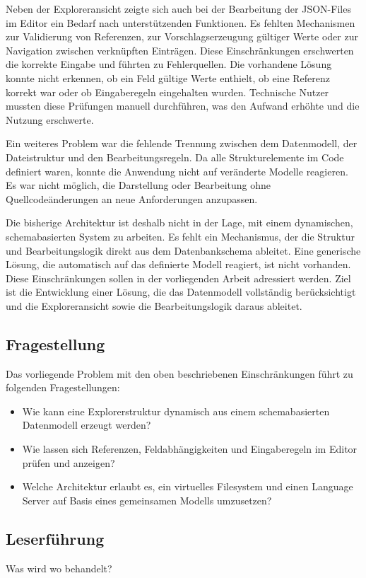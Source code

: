 Neben der Exploreransicht zeigte sich auch bei der Bearbeitung der JSON-Files im Editor ein Bedarf nach unterstützenden Funktionen. Es fehlten Mechanismen zur Validierung von Referenzen, zur Vorschlagserzeugung gültiger Werte oder zur Navigation zwischen verknüpften Einträgen. Diese Einschränkungen erschwerten die korrekte Eingabe und führten zu Fehlerquellen. Die vorhandene Lösung konnte nicht erkennen, ob ein Feld gültige Werte enthielt, ob eine Referenz korrekt war oder ob Eingaberegeln eingehalten wurden. Technische Nutzer mussten diese Prüfungen manuell durchführen, was den Aufwand erhöhte und die Nutzung erschwerte.

Ein weiteres Problem war die fehlende Trennung zwischen dem Datenmodell, der Dateistruktur und den Bearbeitungsregeln. Da alle Strukturelemente im Code definiert waren, konnte die Anwendung nicht auf veränderte Modelle reagieren. Es war nicht möglich, die Darstellung oder Bearbeitung ohne Quellcodeänderungen an neue Anforderungen anzupassen.

Die bisherige Architektur ist deshalb nicht in der Lage, mit einem dynamischen, schemabasierten System zu arbeiten. Es fehlt ein Mechanismus, der die Struktur und Bearbeitungslogik direkt aus dem Datenbankschema ableitet. Eine generische Lösung, die automatisch auf das definierte Modell reagiert, ist nicht vorhanden. Diese Einschränkungen sollen in der vorliegenden Arbeit adressiert werden. Ziel ist die Entwicklung einer Lösung, die das Datenmodell vollständig berücksichtigt und die Exploreransicht sowie die Bearbeitungslogik daraus ableitet.

\subsection{Fragestellung}
Das vorliegende Problem mit den oben beschriebenen Einschränkungen führt zu folgenden Fragestellungen:

\begin{itemize}
  \item Wie kann eine Explorerstruktur dynamisch aus einem schemabasierten Datenmodell erzeugt werden?
  \item Wie lassen sich Referenzen, Feldabhängigkeiten und Eingaberegeln im Editor prüfen und anzeigen?
  \item Welche Architektur erlaubt es, ein virtuelles Filesystem und einen Language Server auf Basis eines gemeinsamen Modells umzusetzen?
\end{itemize}

\subsection{Leserführung}
Was wird wo behandelt?